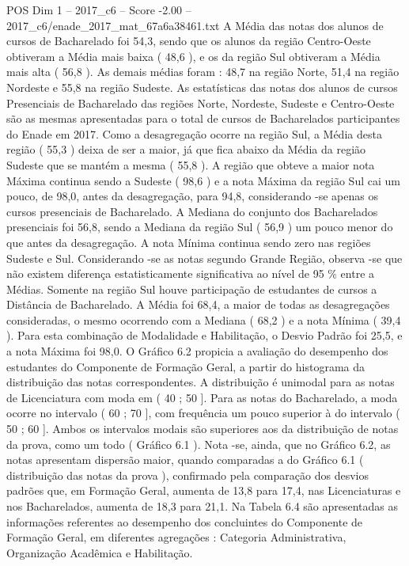 \begin{textsample}{POS Dim 1 – 2017\_c6 – Score -2.00 – 2017\_c6/enade\_2017\_mat\_67a6a38461.txt}
A Média das notas dos alunos de cursos de Bacharelado foi 54,3, sendo que os alunos da região Centro-Oeste obtiveram a Média mais baixa ( 48,6 ), e os da região Sul obtiveram a Média mais alta ( 56,8 ).
As demais médias foram : 48,7 na região Norte, 51,4 na região Nordeste e 55,8 na região Sudeste.
As estatísticas das notas dos alunos de cursos Presenciais de Bacharelado das regiões Norte, Nordeste, Sudeste e Centro-Oeste são as mesmas apresentadas para o total de cursos de Bacharelados participantes do Enade em 2017.
Como a desagregação ocorre na região Sul, a Média desta região ( 55,3 ) deixa de ser a maior, já que fica abaixo da Média da região Sudeste que se mantém a mesma ( 55,8 ).
A região que obteve a maior nota Máxima continua sendo a Sudeste ( 98,6 ) e a nota Máxima da região Sul cai um pouco, de 98,0, antes da desagregação, para 94,8, considerando -se apenas os cursos presenciais de Bacharelado.
A Mediana do conjunto dos Bacharelados presenciais foi 56,8, sendo a Mediana da região Sul ( 56,9 ) um pouco menor do que antes da desagregação.
A nota Mínima continua sendo zero nas regiões Sudeste e Sul.
Considerando -se as notas segundo Grande Região, observa -se que não existem diferença estatisticamente significativa ao nível de 95 \% entre a Médias.
Somente na região Sul houve participação de estudantes de cursos a Distância de Bacharelado.
A Média foi 68,4, a maior de todas as desagregações consideradas, o mesmo ocorrendo com a Mediana ( 68,2 ) e a nota Mínima ( 39,4 ).
Para esta combinação de Modalidade e Habilitação, o Desvio Padrão foi 25,5, e a nota Máxima foi 98,0.
O Gráfico 6.2 propicia a avaliação do desempenho dos estudantes do Componente de Formação Geral, a partir do histograma da distribuição das notas correspondentes.
A distribuição é unimodal para as notas de Licenciatura com moda em ( 40 ; 50 ].
Para as notas do Bacharelado, a moda ocorre no intervalo ( 60 ; 70 ], com frequência um pouco superior à do intervalo ( 50 ; 60 ].
Ambos os intervalos modais são superiores aos da distribuição de notas da prova, como um todo ( Gráfico 6.1 ).
Nota -se, ainda, que no Gráfico 6.2, as notas apresentam dispersão maior, quando comparadas a do Gráfico 6.1 ( distribuição das notas da prova ), confirmado pela comparação dos desvios padrões que, em Formação Geral, aumenta de 13,8 para 17,4, nas Licenciaturas e nos Bacharelados, aumenta de 18,3 para 21,1.
Na Tabela 6.4 são apresentadas as informações referentes ao desempenho dos concluintes do Componente de Formação Geral, em diferentes agregações : Categoria Administrativa, Organização Acadêmica e Habilitação.

\end{textsample}
